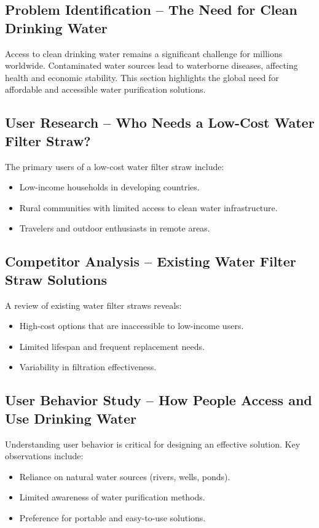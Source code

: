 \documentclass{article}
\begin{document}
\subsection{Problem Identification – The Need for Clean Drinking Water}
Access to clean drinking water remains a significant challenge for millions worldwide. Contaminated water sources lead to waterborne diseases, affecting health and economic stability. This section highlights the global need for affordable and accessible water purification solutions.

\vspace{0.3cm}

\subsection{User Research – Who Needs a Low-Cost Water Filter Straw?}
The primary users of a low-cost water filter straw include:
\begin{itemize}
    \item Low-income households in developing countries.
    \item Rural communities with limited access to clean water infrastructure.
    \item Travelers and outdoor enthusiasts in remote areas.
\end{itemize}

\vspace{0.3cm}

\subsection{Competitor Analysis – Existing Water Filter Straw Solutions}
A review of existing water filter straws reveals:
\begin{itemize}
    \item High-cost options that are inaccessible to low-income users.
    \item Limited lifespan and frequent replacement needs.
    \item Variability in filtration effectiveness.
\end{itemize}

\vspace{0.3cm}

\subsection{User Behavior Study – How People Access and Use Drinking Water}
Understanding user behavior is critical for designing an effective solution. Key observations include:
\begin{itemize}
    \item Reliance on natural water sources (rivers, wells, ponds).
    \item Limited awareness of water purification methods.
    \item Preference for portable and easy-to-use solutions.
\end{itemize}
\end{document}

